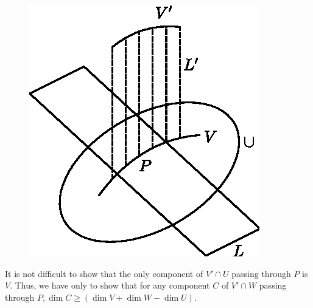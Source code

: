\begin{figure}[H]
\centerline{\includegraphics{vol36-figures/fig36-1.eps}}
\end{figure}

 It is not difficult to show that the only component of $ V' \cap U$
 passing through $P$ is $V$. Thus, we have only to show that for any
 component $C$ of  $V' \cap W$ passing  through $P, \dim C \ge
 (\dim V + \dim  W- \dim U)$. 

